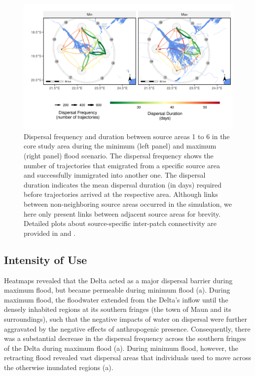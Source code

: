 \documentclass[../FinalThesis.tex]{subfiles}
\begin{document}
\begin{figure}[htpb]
 \begin{center}
  \includegraphics[width = \textwidth]{Figures/InterpatchConnectivityMap.png}
  \caption{Dispersal frequency and duration between source areas 1 to 6 in the
  core study area during the minimum (left panel) and maximum (right panel)
  flood scenario. The dispersal frequency shows the number of trajectories that
  emigrated from a specific source area and successfully immigrated into another
  one. The dispersal duration indicates the mean dispersal duration (in days)
  required before trajectories arrived at the respective area. Although links
  between non-neighboring source areas occurred in the simulation, we here only
  present links between adjacent source areas for brevity. Detailed plots about
  source-specific inter-patch connectivity are provided in  and
  .}
  \label{IPCMap}
 \end{center}
\end{figure}

\subsection{Intensity of Use}

Heatmaps revealed that the Delta acted as a major dispersal barrier during
maximum flood, but became permeable during minimum flood (a).
During maximum flood, the floodwater extended from the Delta's inflow until the
densely inhabited regions at its southern fringes (the town of Maun and its
surroundings), such that the negative impacts of water on dispersal were further
aggravated by the negative effects of anthropogenic presence. Consequently,
there was a substantial decrease in the dispersal frequency across the southern
fringes of the Delta during maximum flood (a). During minimum
flood, however, the retracting flood revealed vast dispersal areas that
individuals used to move across the otherwise inundated regions
(a).
\end{document}
